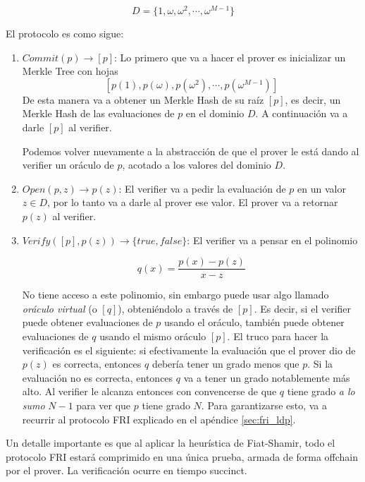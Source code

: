 $$D=\{1, \omega, \omega ^2, \cdots, \omega ^{M-1}\}$$

El protocolo es como sigue:

\begin{enumerate}
    \item $Commit(p) \rightarrow [p]$: Lo primero que va a hacer el prover es inicializar un Merkle Tree con hojas $$[p(1), p(\omega),p(\omega^2),\cdots, p(\omega^{M-1})]$$
    De esta manera va a obtener un Merkle Hash de su raíz $[p]$, es decir, un Merkle Hash de las evaluaciones de $p$ en el dominio $D$. A continuación va a darle $[p]$ al verifier. 

    Podemos volver nuevamente a la abstracción de que el prover le está dando al verifier un oráculo de $p$, acotado a los valores del dominio $D$. 

    \item $Open(p, z) \rightarrow p(z)$: El verifier va a pedir la evaluación de $p$ en un valor $z \in D$, por lo tanto va a darle al prover ese valor. El prover va a retornar $p(z)$ al verifier. 
    
    \item $Verify([p], p(z))\rightarrow \{true, false\}$: El verifier va a pensar en el polinomio 
    
    $$q(x) = \frac{p(x) - p(z)}{x-z}$$
    
    No tiene acceso a este polinomio, sin embargo puede usar algo llamado \textit{oráculo virtual} (o $[q]$), obteniéndolo a través de $[p]$. Es decir, si el verifier puede obtener evaluaciones de $p$ usando el oráculo, también puede obtener evaluaciones de $q$ usando el mismo oráculo $[p]$. El truco para hacer la verificación es el siguiente: si efectivamente la evaluación que el prover dio de $p(z)$ es correcta, entonces $q$ debería tener un grado menos que $p$. Si la evaluación no es correcta, entonces $q$ va a tener un grado notablemente más alto. Al verifier le alcanza entonces con convencerse de que $q$ tiene grado \textit{a lo sumo} $N-1$ para ver que $p$ tiene grado $N$. Para garantizarse esto, va a recurrir al protocolo FRI explicado en el apéndice \ref{sec:fri_ldp}.
    
\end{enumerate}

Un detalle importante es que al aplicar la heurística de Fiat-Shamir, todo el protocolo FRI estará comprimido en una única prueba, armada de forma offchain por el prover. La verificación ocurre en tiempo succinct.

